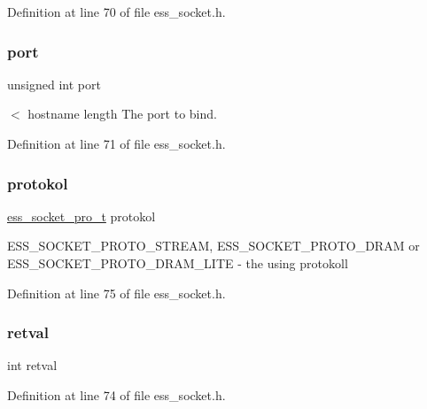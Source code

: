 Definition at line 70 of file ess\+\_\+socket.\+h.

\mbox{\label{structess__socket_a938bdc6ae46c346147b6d4f67ad1e704}} 
\subsubsection{\texorpdfstring{port}{port}}
{\footnotesize\ttfamily unsigned int port}

$<$ hostname length The port to bind. 

Definition at line 71 of file ess\+\_\+socket.\+h.

\mbox{\label{structess__socket_a1f0429596710512357072b192ba3d2bd}} 
\subsubsection{\texorpdfstring{protokol}{protokol}}
{\footnotesize\ttfamily \hyperlink{ess__socket_8h_a1e8e8de805f8e0b7da25e3b177977273}{ess\+\_\+socket\+\_\+pro\+\_\+t} protokol}

{\ttfamily E\+S\+S\+\_\+\+S\+O\+C\+K\+E\+T\+\_\+\+P\+R\+O\+T\+O\+\_\+\+S\+T\+R\+E\+AM}, {\ttfamily E\+S\+S\+\_\+\+S\+O\+C\+K\+E\+T\+\_\+\+P\+R\+O\+T\+O\+\_\+\+D\+R\+AM} or {\ttfamily E\+S\+S\+\_\+\+S\+O\+C\+K\+E\+T\+\_\+\+P\+R\+O\+T\+O\+\_\+\+D\+R\+A\+M\+\_\+\+L\+I\+TE} -\/ the using protokoll 

Definition at line 75 of file ess\+\_\+socket.\+h.

\mbox{\label{structess__socket_a7f345697df7eb20c9aba1ab6980cae8f}} 
\subsubsection{\texorpdfstring{retval}{retval}}
{\footnotesize\ttfamily int retval}



Definition at line 74 of file ess\+\_\+socket.\+h.

\mbox{\label{structess__socket_a3666576f6b88007cc7b8f26c7da596c8}} 

